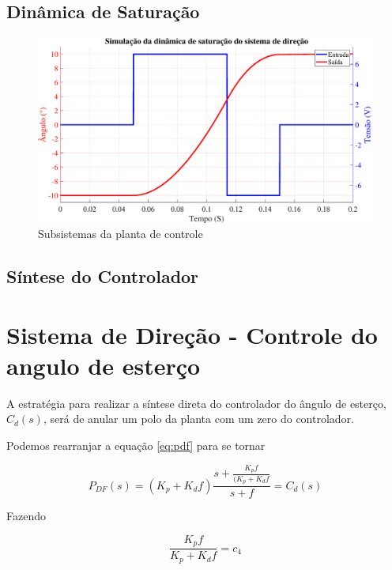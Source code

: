 	    \subsection{Dinâmica de Saturação}
	    
	        \begin{figure}[h]
                \centering
                \includegraphics[width=15cm]{Imagens/cap4/sis_direcao/simusat_direcao.eps}
                \caption{Subsistemas da planta de controle}
                \label{subsistemas}
            \end{figure}
            
        \subsection{Síntese do Controlador}
	
	
	\section{Sistema de Direção - Controle do angulo de esterço}
	
	    A estratégia para realizar a síntese direta do controlador do ângulo de esterço, $C_d(s)$,  será de anular um polo da planta com um zero do controlador.
	    
	    Podemos rearranjar a equação \ref{eq:pdf} para se tornar
	    
	    \begin{equation}
	        P_{DF}(s) = (K_p + K_d f) \frac{s + \frac{K_p f}{(K_p + K_d f}}{s + f} = C_d(s)
	    \end{equation}
	    
	    Fazendo
	    
	    \begin{equation}
	        \frac{K_p f}{K_p + K_d f} = c_4
	    \end{equation}
	    
